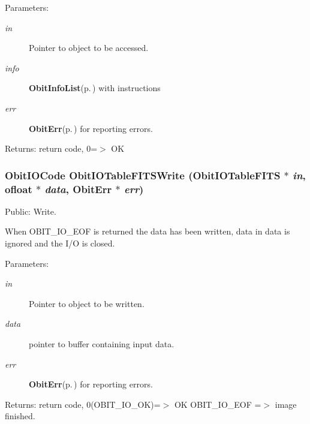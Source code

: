 \begin{Desc}
\item[Parameters:]
\begin{description}
\item[{\em in}]Pointer to object to be accessed. \item[{\em info}]{\bf Obit\-Info\-List}{\rm (p.\,\pageref{structObitInfoList})} with instructions \item[{\em err}]{\bf Obit\-Err}{\rm (p.\,\pageref{structObitErr})} for reporting errors. \end{description}
\end{Desc}
\begin{Desc}
\item[Returns:]return code, 0=$>$ OK \end{Desc}
\subsubsection{\setlength{\rightskip}{0pt plus 5cm}Obit\-IOCode Obit\-IOTable\-FITSWrite ({\bf Obit\-IOTable\-FITS} $\ast$ {\em in}, {\bf ofloat} $\ast$ {\em data}, {\bf Obit\-Err} $\ast$ {\em err})}\label{ObitIOTableFITS_8c_a26}


Public: Write. 

When OBIT\_\-IO\_\-EOF is returned the data has been written, data in data is ignored and the I/O is closed. \begin{Desc}
\item[Parameters:]
\begin{description}
\item[{\em in}]Pointer to object to be written. \item[{\em data}]pointer to buffer containing input data. \item[{\em err}]{\bf Obit\-Err}{\rm (p.\,\pageref{structObitErr})} for reporting errors. \end{description}
\end{Desc}
\begin{Desc}
\item[Returns:]return code, 0(OBIT\_\-IO\_\-OK)=$>$ OK OBIT\_\-IO\_\-EOF =$>$ image finished. \end{Desc}
